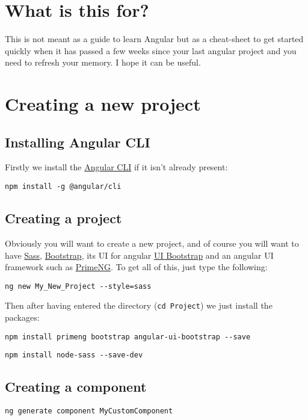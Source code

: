 \providecommand{\main}{.}




{\hypersetup{hidelinks}
    \tableofcontents  %
}

\chapter{What is this for?}
This is not meant as a guide to learn Angular but as a cheat-sheet to get started quickly when it has passed a few weeks since your last angular project and you need to refresh your memory. I hope it can be useful.

\chapter{Creating a new project}
\section{Installing Angular CLI}
Firstly we install the \href{https://cli.angular.io/}{Angular CLI} if it isn't already present:

\begin{verbatim}
npm install -g @angular/cli
\end{verbatim}

\section{Creating a project}
Obviously you will want to create a new project, and of course you will want to have \href{https://sass-lang.com/}{Sass}, \href{https://getbootstrap.com/}{Bootstrap}, its UI for angular \href{https://angular-ui.github.io/bootstrap/}{UI Bootstrap} and an angular UI framework such as \href{https://www.primefaces.org/primeng/#/}{PrimeNG}. To get all of this, just type the following:

\begin{verbatim}
ng new My_New_Project --style=sass
\end{verbatim}

Then after having entered the directory (\texttt{cd Project}) we just install the packages:

\begin{verbatim}
npm install primeng bootstrap angular-ui-bootstrap --save
\end{verbatim}

\begin{verbatim}
npm install node-sass --save-dev
\end{verbatim}

\section{Creating a component}
\begin{verbatim}
ng generate component MyCustomComponent
\end{verbatim}

